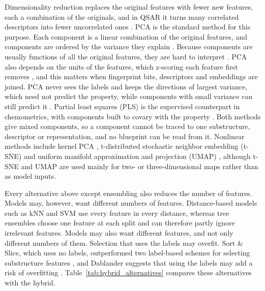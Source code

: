 Dimensionality reduction replaces the original features with fewer new features, each a combination of the originals, and in QSAR it turns many correlated descriptors into fewer uncorrelated ones \citep{Niazi2023}. PCA is the standard method for this purpose. Each component is a linear combination of the original features, and components are ordered by the variance they explain \citep{Jolliffe2016}. Because components are usually functions of all the original features, they are hard to interpret \citep{Jolliffe2016}. PCA also depends on the units of the features, which z-scoring each feature first removes \citep{Jolliffe2016}, and this matters when fingerprint bits, descriptors and embeddings are joined. PCA never sees the labels and keeps the directions of largest variance, which need not predict the property, while components with small variance can still predict it \citep{Jolliffe1982}. Partial least squares (PLS) is the supervised counterpart in chemometrics, with components built to covary with the property \citep{Wold2001}. Both methods give mixed components, so a component cannot be traced to one substructure, descriptor or representation, and no blueprint can be read from it. Nonlinear methods include kernel PCA \citep{Niazi2023}, t-distributed stochastic neighbor embedding (t-SNE) \citep{vanderMaaten2008} and uniform manifold approximation and projection (UMAP) \citep{McInnes2018}, although t-SNE and UMAP are used mainly for two- or three-dimensional maps rather than as model inputs.

Every alternative above except ensembling also reduces the number of features. Models may, however, want different numbers of features. Distance-based models such as kNN and SVM use every feature in every distance, whereas tree ensembles choose one feature at each split and can therefore partly ignore irrelevant features. Models may also want different features, and not only different numbers of them. Selection that uses the labels may overfit. Sort \& Slice, which uses no labels, outperformed two label-based schemes for selecting substructure features \citep{sns}, and Dablander suggests that using the labels may add a risk of overfitting \citep[p.~138]{Dablander2024}. Table~\ref{tab:hybrid_alternatives} compares these alternatives with the hybrid.

